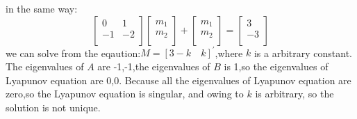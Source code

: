 \documentclass{article}
\newcommand{\rmnum}[1]{\romannumeral #1}
\begin{document}
\subsection*{\rmnum{2}}
in the same way:
\[
\left[
\begin{array}{cc}
0 & 1\\
-1 & -2\\
\end{array}
\right]
\left[
\begin{array}{c}
m_1\\
m_2\\
\end{array}
\right]+
\left[
\begin{array}{c}
m_1\\
m_2\\
\end{array}
\right]
=
\left[
\begin{array}{c}
3\\
-3\\
\end{array}  
\right]  
\]
we can solve from the eqaution:$M=[3-k \quad k]^{'}$,where $k$ is a arbitrary constant.
The eigenvalues of $A$ are -1,-1,the eigenvalues of $B$ is 1,so the eigenvalues of Lyapunov equation are 0,0.
Because all the eigenvalues of Lyapunov equation are zero,so the Lyapunov equation is singular, and owing to $k$ is arbitrary,
so the solution is not unique.
\end{document}
